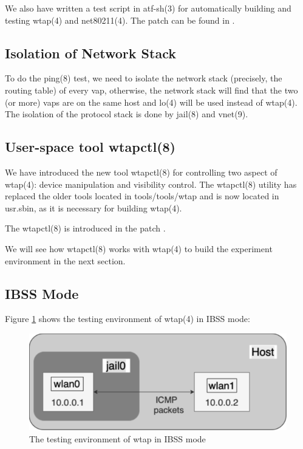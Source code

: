 \documentclass[conference]{IEEEtran}
\begin{document}
We also have written a test script in atf-sh(3) for automatically building and testing wtap(4) and net80211(4). The patch can be found in \cite{commit:atf}.

\subsection{Isolation of Network Stack}
To do the ping(8) test, we need to isolate the network stack (precisely, the routing table) of every vap, otherwise, the network stack will find that the two (or more) vaps are on the same host and lo(4) will be used instead of wtap(4). The isolation of the protocol stack is done by jail(8) and vnet(9).

\subsection{User-space tool wtapctl(8)}
We have introduced the new tool wtapctl(8) for controlling two aspect of wtap(4): device manipulation and visibility control. The wtapctl(8) utility has replaced the older tools located in tools/tools/wtap and is now located in usr.sbin, as it is necessary for building wtap(4).

The wtapctl(8) is introduced in the patch \cite{commit:wtapctl}. 

We will see how wtapctl(8) works with wtap(4) to build the experiment environment in the next section.

\subsection{IBSS Mode}
Figure \ref{fig:ibss-test} shows the testing environment of wtap(4) in IBSS mode:

\begin{figure}[h]
\includegraphics[scale=0.4]{ping-ibss-experiment-modified.png}
\caption{The testing environment of wtap in IBSS mode}
\label{fig:ibss-test}
\end{figure}
\end{document}
